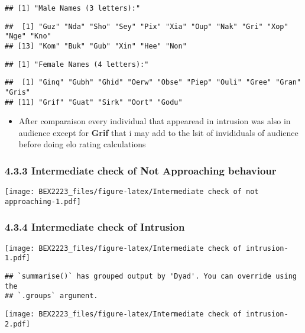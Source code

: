\documentclass[
]{article}
\providecommand{\tightlist}{%
  \setlength{\itemsep}{0pt}\setlength{\parskip}{0pt}}
\begin{document}
\begin{verbatim}
## [1] "Male Names (3 letters):"
\end{verbatim}

\begin{verbatim}
##  [1] "Guz" "Nda" "Sho" "Sey" "Pix" "Xia" "Oup" "Nak" "Gri" "Xop" "Nge" "Kno"
## [13] "Kom" "Buk" "Gub" "Xin" "Hee" "Non"
\end{verbatim}

\begin{verbatim}
## [1] "Female Names (4 letters):"
\end{verbatim}

\begin{verbatim}
##  [1] "Ginq" "Gubh" "Ghid" "Oerw" "Obse" "Piep" "Ouli" "Gree" "Gran" "Gris"
## [11] "Grif" "Guat" "Sirk" "Oort" "Godu"
\end{verbatim}

\begin{itemize}
\tightlist
\item
  After comparaison every individual that appearead in intrusion was
  also in audience except for \textbf{Grif} that i may add to the lsit
  of invididuals of audience before doing elo rating calculations
\end{itemize}

\hypertarget{intermediate-check-of-not-approaching-behaviour}{%
\subsubsection{4.3.3 Intermediate check of Not Approaching
behaviour}\label{intermediate-check-of-not-approaching-behaviour}}

\texttt{[image: BEX2223\_files/figure-latex/Intermediate check of not approaching-1.pdf]}

\hypertarget{intermediate-check-of-intrusion}{%
\subsubsection{4.3.4 Intermediate check of
Intrusion}\label{intermediate-check-of-intrusion}}

\texttt{[image: BEX2223\_files/figure-latex/Intermediate check of intrusion-1.pdf]}

\begin{verbatim}
## `summarise()` has grouped output by 'Dyad'. You can override using the
## `.groups` argument.
\end{verbatim}

\texttt{[image: BEX2223\_files/figure-latex/Intermediate check of intrusion-2.pdf]}
\end{document}
